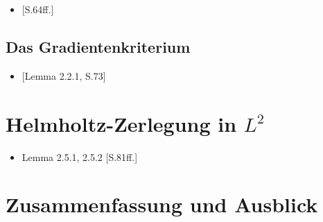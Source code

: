 \begin{itemize}
  \item \cite{sohr2001navier}[S.64ff.]
\end{itemize}

\section{Das Gradientenkriterium}

\begin{itemize}
  \item \cite{sohr2001navier}[Lemma 2.2.1, S.73]
\end{itemize}

\chapter{Helmholtz-Zerlegung in $L^2$}

\begin{itemize}
  \item Lemma 2.5.1, 2.5.2 \cite{sohr2001navier}[S.81ff.]
\end{itemize}

\chapter{Zusammenfassung und Ausblick}
